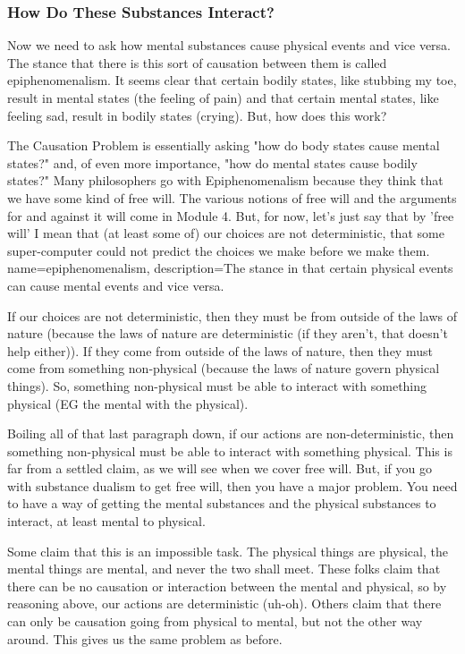 \subsubsection{How Do These Substances Interact?}

Now we need to ask how mental substances cause physical events and vice versa. The stance that there is this sort of causation between them is called \gls{epiphenomenalism}. It seems clear that certain bodily states, like stubbing my toe, result in mental states (the feeling of pain) and that certain mental states, like feeling sad, result in bodily states (crying). But, how does this work?

The Causation Problem is essentially asking "how do body states cause mental states?" and, of even more importance, "how do mental states cause bodily states?" Many philosophers go with Epiphenomenalism because they think that we have some kind of free will. The various notions of free will and the arguments for and against it will come in Module 4. But, for now, let's just say that by 'free will' I mean that (at least some of) our choices are not deterministic, that some super-computer could not predict the choices we make before we make them.
{
name=epiphenomenalism,
description={The stance in that certain physical events can cause mental events and vice versa.}
}

If our choices are not deterministic, then they must be from outside of the laws of nature (because the laws of nature are deterministic (if they aren't, that doesn't help either)).  If they come from outside of the laws of nature, then they must come from something non-physical (because the laws of nature govern physical things). So, something non-physical must be able to interact with something physical (EG the mental with the physical).

Boiling all of that last paragraph down, if our actions are non-deterministic, then something non-physical must be able to interact with something physical. This is far from a settled claim, as we will see when we cover free will. But, if you go with substance dualism to get free will, then you have a major problem. You need to have a way of getting the mental substances and the physical substances to interact, at least mental to physical. 

Some claim that this is an impossible task. The physical things are physical, the mental things are mental, and never the two shall meet. These folks claim that there can be no causation or interaction between the mental and physical, so by reasoning above, our actions are deterministic (uh-oh). Others claim that there can only be causation going from physical to mental, but not the other way around. This gives us the same problem as before.

